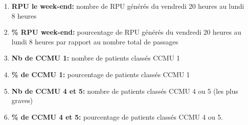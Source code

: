 \documentclass[12pt,english,french,twoside]{book}\usepackage[]{graphicx}\usepackage[]{color}
\begin{document}
\begin{enumerate}
  \item \textbf{RPU le week-end:} nombre de RPU générés du vendredi 20 heures au lundi 8 heures
  \item \textbf{\% RPU week-end:} pourcentage de RPU générés du vendredi 20 heures au lundi 8 heures par rapport au nombre total de passages
  \item \textbf{Nb de CCMU 1:} nombre de patients classés CCMU 1
  \item \textbf{\% de CCMU 1:} pourcentage de patients classés CCMU 1
  \item \textbf{Nb de CCMU 4 et 5:} nombre  de patients classés CCMU 4 ou 5 (les plus graves)
  \item \textbf{\% de CCMU 4 et 5:} pourcentage  de patients classés CCMU 4 ou 5.
\end{enumerate}
\end{document}
